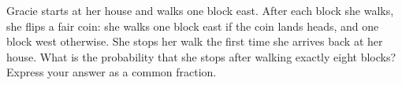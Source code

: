Gracie starts at her house and walks one block east. After each block she walks, she flips a fair coin: she walks one block east if the coin lands heads, and one block west otherwise. She stops her walk the first time she arrives back at her house. What is the probability that she stops after walking exactly eight blocks? Express your answer as a common fraction.
